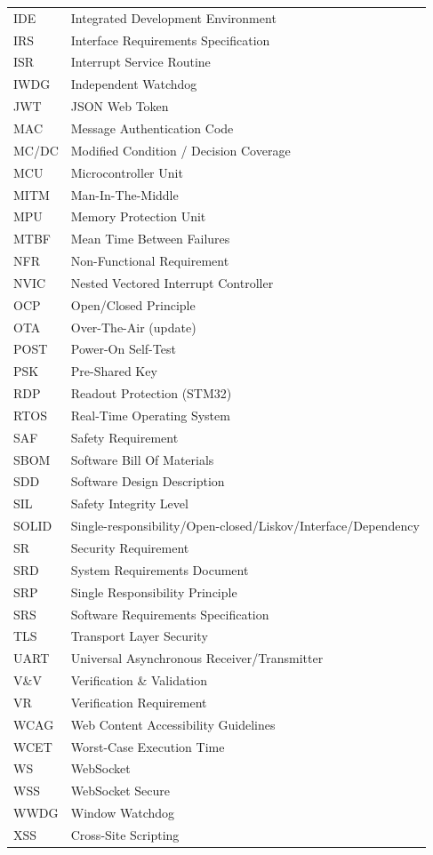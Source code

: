 \begin{tabularx}{\textwidth}{|l|X|}
IDE   & Integrated Development Environment \\
IRS   & Interface Requirements Specification \\
ISR   & Interrupt Service Routine \\
IWDG  & Independent Watchdog \\
JWT   & JSON Web Token \\
MAC   & Message Authentication Code \\
MC/DC & Modified Condition / Decision Coverage \\
MCU   & Microcontroller Unit \\
MITM  & Man-In-The-Middle \\
MPU   & Memory Protection Unit \\
MTBF  & Mean Time Between Failures \\
NFR   & Non-Functional Requirement \\
NVIC  & Nested Vectored Interrupt Controller \\
OCP   & Open/Closed Principle \\
OTA   & Over-The-Air (update) \\
POST  & Power-On Self-Test \\
PSK   & Pre-Shared Key \\
RDP   & Readout Protection (STM32) \\
RTOS  & Real-Time Operating System \\
SAF   & Safety Requirement \\
SBOM  & Software Bill Of Materials \\
SDD   & Software Design Description \\
SIL   & Safety Integrity Level \\
SOLID & Single-responsibility/Open-closed/Liskov/Interface/Dependency \\
SR    & Security Requirement \\
SRD   & System Requirements Document \\
SRP   & Single Responsibility Principle \\
SRS   & Software Requirements Specification \\
TLS   & Transport Layer Security \\
UART  & Universal Asynchronous Receiver/Transmitter \\
V\&V  & Verification \& Validation \\
VR    & Verification Requirement \\
WCAG  & Web Content Accessibility Guidelines \\
WCET  & Worst-Case Execution Time \\
WS    & WebSocket \\
WSS   & WebSocket Secure \\
WWDG  & Window Watchdog \\
XSS   & Cross-Site Scripting \\
\hline
\end{tabularx}
